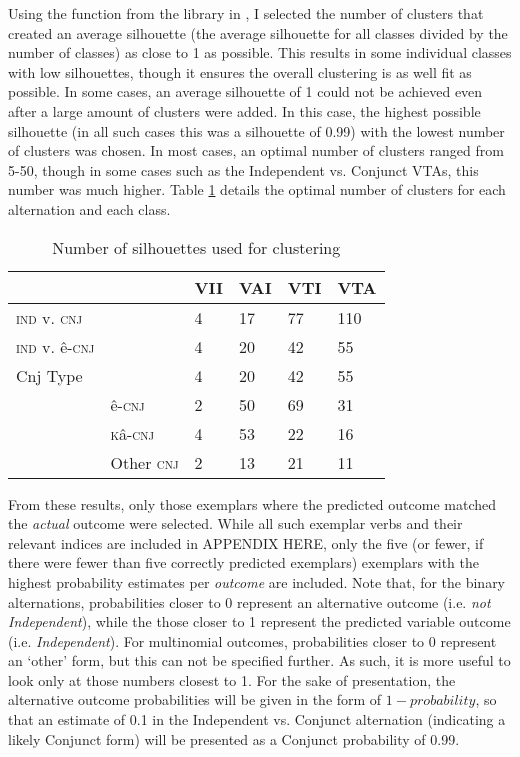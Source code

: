 Using the  function from the  library in  \citep{facto}, I selected the number of clusters that created an average silhouette (the average silhouette for all classes divided by the number of classes) as close to 1 as possible. This results in some individual classes with low silhouettes, though it ensures the overall clustering is as well fit as possible. In some cases, an average silhouette of 1 could not be achieved even after a large amount of clusters were added. In this case, the highest possible silhouette (in all such cases this was a silhouette of 0.99) with the lowest number of clusters was chosen. In most cases, an optimal number of clusters ranged from 5-50, though in some cases such as the Independent vs. Conjunct VTAs, this number was much higher. Table \ref{tab:exemplarsil} details the optimal number of clusters for each alternation and each class.

\begin{table}[]
\begin{tabular}{@{}llllll@{}}
\toprule
             &                        & VII & VAI    & VTI & VTA   \\
             \midrule
\textsc{ind} v. \textsc{cnj}   &      & 4   & 17     & 77  & 110 \\
\textsc{ind} v. ê-\textsc{cnj} &      & 4   & 20     & 42  & 55   \\
Cnj Type                       &      & 4   & 20     & 42  & 55   \\
       & ê-\textsc{cnj}               & 2   & 50     & 69  & 31   \\
       & \textsc{k}â-\textsc{cnj}              & 4   & 53     & 22  & 16   \\
       & Other \textsc{cnj}           & 2   & 13     & 21  & 11   \\

\bottomrule
\end{tabular}
\caption{Number of silhouettes used for clustering \\ \label{tab:exemplarsil}}
\end{table}

From these results, only those exemplars where the predicted outcome matched the \textit{actual} outcome were selected. While all such exemplar verbs and their relevant indices are included in APPENDIX HERE, only the five (or fewer, if there were fewer than five correctly predicted exemplars) exemplars with the highest probability estimates per \textit{outcome} are included. Note that, for the binary alternations, probabilities closer to 0 represent an alternative outcome (i.e. \textit{not Independent}), while the those closer to 1 represent the predicted variable outcome (i.e. \textit{Independent}). For multinomial outcomes, probabilities closer to 0 represent an `other' form, but this can not be specified further. As such, it is more useful to look only at those numbers closest to 1. For the sake of presentation, the alternative outcome probabilities will be given in the form of $1-probability$, so that an estimate of 0.1 in the Independent vs. Conjunct alternation (indicating a likely Conjunct form) will be presented as a Conjunct probability of 0.99.

